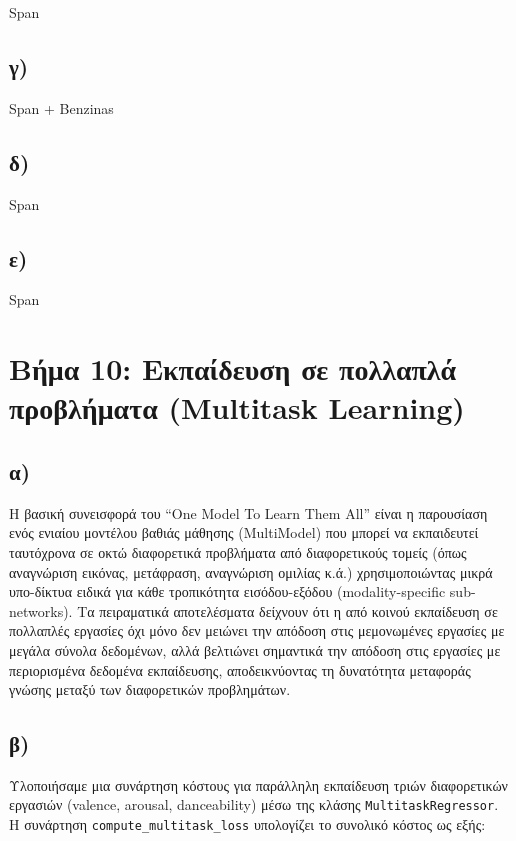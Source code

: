 \documentclass[a4paper,12pt]{article}
\begin{document}
Span

\subsection*{γ)}

Span + Benzinas

\subsection*{δ)}

Span

\subsection*{ε)}

Span

\section*{Βήμα 10: Εκπαίδευση σε πολλαπλά προβλήματα (Multitask Learning)}

\subsection*{α)}

Η βασική συνεισφορά του ``One Model To Learn Them All'' είναι η παρουσίαση ενός ενιαίου μοντέλου βαθιάς μάθησης 
(MultiModel) που μπορεί να εκπαιδευτεί ταυτόχρονα σε οκτώ διαφορετικά προβλήματα από διαφορετικούς τομείς 
(όπως αναγνώριση εικόνας, μετάφραση, αναγνώριση ομιλίας κ.ά.) χρησιμοποιώντας μικρά υπο-δίκτυα ειδικά για κάθε τροπικότητα εισόδου-εξόδου 
(modality-specific sub-networks). Τα πειραματικά αποτελέσματα δείχνουν ότι η από κοινού εκπαίδευση σε πολλαπλές εργασίες 
όχι μόνο δεν μειώνει την απόδοση στις μεμονωμένες εργασίες με μεγάλα σύνολα δεδομένων, αλλά βελτιώνει σημαντικά την 
απόδοση στις εργασίες με περιορισμένα δεδομένα εκπαίδευσης, αποδεικνύοντας τη δυνατότητα μεταφοράς γνώσης μεταξύ των διαφορετικών προβλημάτων.

\subsection*{β)}

Υλοποιήσαμε μια συνάρτηση κόστους για παράλληλη εκπαίδευση τριών διαφορετικών εργασιών (valence, arousal, danceability) μέσω της κλάσης \texttt{MultitaskRegressor}. Η συνάρτηση \texttt{compute\_multitask\_loss} υπολογίζει το συνολικό κόστος ως εξής:
\end{document}
